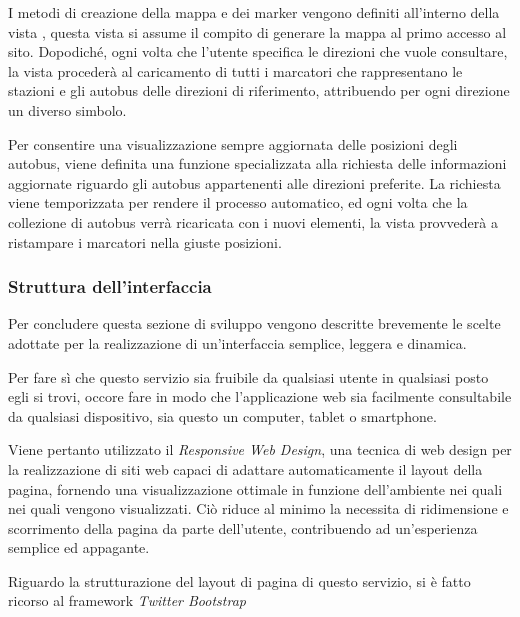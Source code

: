 I metodi di creazione della mappa e dei marker vengono definiti all'interno della vista , questa vista si assume il compito di generare la mappa al primo accesso al sito. Dopodiché, ogni volta che l'utente specifica le direzioni che vuole consultare, la vista procederà al caricamento di tutti i marcatori che rappresentano le stazioni e gli autobus delle direzioni di riferimento, attribuendo per ogni direzione un diverso simbolo.

Per consentire una visualizzazione sempre aggiornata delle posizioni degli autobus, viene definita una funzione specializzata alla richiesta delle informazioni aggiornate riguardo gli autobus appartenenti alle direzioni preferite. La richiesta viene temporizzata per rendere il processo automatico, ed ogni volta che la collezione di autobus verrà ricaricata con i nuovi elementi, la vista provvederà a ristampare i marcatori nella giuste posizioni.

\subsubsection{Struttura dell'interfaccia} %
\label{ssub:struttura_dell_interfaccia}

Per concludere questa sezione di sviluppo vengono descritte brevemente le scelte adottate per la realizzazione di un'interfaccia semplice, leggera e dinamica.

Per fare sì che questo servizio sia fruibile da qualsiasi utente in qualsiasi posto egli si trovi, occore fare in modo che l'applicazione web sia facilmente consultabile da qualsiasi dispositivo, sia questo un computer, tablet o smartphone.

Viene pertanto utilizzato il {\itshape Responsive Web Design}, una tecnica di web design per la realizzazione di siti web capaci di adattare automaticamente il layout della pagina, fornendo una visualizzazione ottimale in funzione dell'ambiente nei quali nei quali vengono visualizzati. Ciò riduce al minimo la necessita di ridimensione e scorrimento della pagina da parte dell'utente, contribuendo ad un'esperienza semplice ed appagante.
\vspace{0.5cm}

Riguardo la strutturazione del layout di pagina di questo servizio, si è fatto ricorso al framework {\itshape Twitter Bootstrap}


